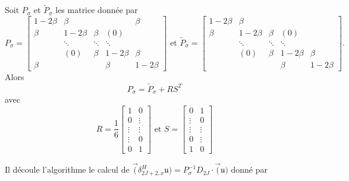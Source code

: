 \begin{proposition}
Soit $P_{\sigma}$ et $\tilde{P}_{\sigma}$ les matrice donnée par 
\begin{equation}
P_{\sigma} = \begin{bmatrix}
  1 - 2 \beta & \beta &   &   & \beta \\ 
  \beta & 1 - 2 \beta & \beta & (0) &   \\ 
    & \ddots & \ddots & \ddots &   \\ 
    & (0) & \beta & 1 - 2 \beta & \beta \\ 
  \beta &   &   & \beta & 1 - 2 \beta
  \end{bmatrix}  \text{ et }
\tilde{P}_{\sigma} = 
\begin{bmatrix}
  1 - 2 \beta & \beta &   &   &  \\ 
  \beta & 1 - 2 \beta & \beta & (0) &   \\ 
    & \ddots & \ddots & \ddots &   \\ 
    & (0) & \beta & 1 - 2 \beta & \beta \\ 
   &   &   & \beta & 1 - 2 \beta
  \end{bmatrix} .
\end{equation}
Alors 
\begin{equation}
P_{\sigma} = \tilde{P}_{\sigma} + R S^T
\end{equation} 
avec 
\begin{equation}
R = \dfrac{1}{6}\begin{bmatrix}
1 & 0 \\ 
0 & \vdots \\ 
\vdots & \vdots \\ 
\vdots & 0 \\ 
0 & 1
\end{bmatrix} \text{ et } 
S = \begin{bmatrix}
0 & 1 \\ 
\vdots & 0 \\ 
\vdots & \vdots \\ 
0 & \vdots \\ 
1 & 0
\end{bmatrix} 
\end{equation}
\end{proposition}

Il découle l'algorithme le calcul de $\vec (\delta_{2J+2,x}^H \mathfrak{u}) = P^{-1}_{\sigma} D_{2J} \cdot \vec (\mathfrak{u})$ donné par


